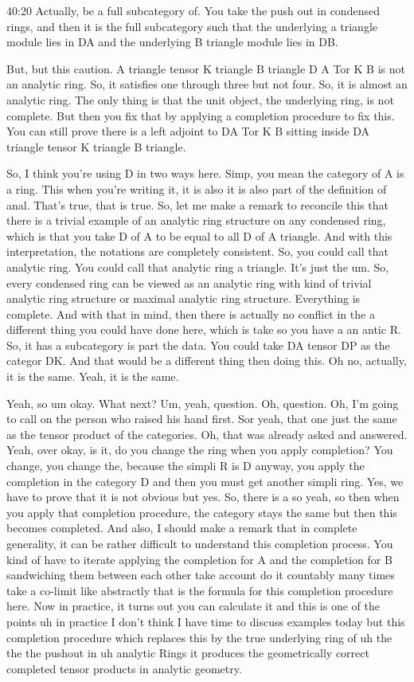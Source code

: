 \begin{unfinished}{40:20}
Actually, be a full subcategory of. You take the push out in condensed rings, and then it is the full subcategory such that the underlying a triangle module lies in DA and the underlying B triangle module lies in DB.

But, but this caution. A triangle tensor K triangle B triangle D A Tor K B is not an analytic ring. So, it satisfies one through three but not four. So, it is almost an analytic ring. The only thing is that the unit object, the underlying ring, is not complete. But then you fix that by applying a completion procedure to fix this. You can still prove there is a left adjoint to DA Tor K B sitting inside DA triangle tensor K triangle B triangle.

So, I think you're using D in two ways here. Simp, you mean the category of A is a ring. This when you're writing it, it is also it is also part of the definition of anal. That's true, that is true. So, let me make a remark to reconcile this that there is a trivial example of an analytic ring structure on any condensed ring, which is that you take D of A to be equal to all D of A triangle. And with this interpretation, the notations are completely consistent. So, you could call that analytic ring. You could call that analytic ring a triangle. It's just the um. So, every condensed ring can be viewed as an analytic ring with kind of trivial analytic ring structure or maximal analytic ring structure. Everything is complete. And with that in mind, then there is actually no conflict in the a different thing you could have done here, which is take so you have a an antic R. So, it has a subcategory is part the data. You could take DA tensor DP as the categor DK. And that would be a different thing then doing this. Oh no, actually, it is the same. Yeah, it is the same.

Yeah, so um okay. What next? Um, yeah, question. Oh, question. Oh, I'm going to call on the person who raised his hand first. Sor yeah, that one just the same as the tensor product of the categories. Oh, that was already asked and answered. Yeah, over okay, is it, do you change the ring when you apply completion? You change, you change the, because the simpli R is D anyway, you apply the completion in the category D and then you must get another simpli ring. Yes, we have to prove that it is not obvious but yes. So, there is a so yeah, so then when you apply that completion procedure, the category stays the same but then this becomes completed. And also, I should make a remark that in complete generality, it can be rather difficult to understand this completion process. You kind of have to iterate applying the completion for A and the completion for B sandwiching them between each other take account do it countably many times take a co-limit like abstractly that is the formula for this completion procedure here. Now in practice, it turns out you can calculate it and this is one of the points uh in practice I don't think I have time to discuss examples today but this completion procedure which replaces this by the true underlying ring of uh the the the pushout in uh analytic Rings it produces the geometrically correct completed tensor products in analytic geometry.


\end{unfinished}
